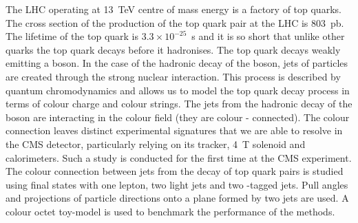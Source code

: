 The LHC operating at 13~TeV centre of mass energy is a factory of top quarks. The cross section of the production of the top quark pair at the LHC is 803~pb. The lifetime of the top quark is $3.3\times10^{-25}$~s and it is so short that unlike other quarks the top quark decays before it hadronises. The top quark decays weakly emitting a \PW boson. In the case of the hadronic decay of the \PW boson, jets of particles are created through the strong nuclear interaction. This process is described by quantum chromodynamics and allows us to model the top quark decay process in terms of colour charge and colour strings. The jets from the hadronic decay of the \PW boson are interacting in the colour field (they are colour - connected). The colour connection leaves distinct experimental signatures that we are able to resolve in the CMS detector, particularly relying on its tracker, 4~T solenoid and calorimeters. Such a study is conducted for the first time at the CMS experiment. The colour connection between jets from the decay of top quark pairs is studied using final states with one lepton, two light jets and two \cPqb-tagged jets. Pull angles and projections of particle directions onto a plane formed by two jets are used. A colour octet \PW toy-model is used to benchmark the performance of the methods.
